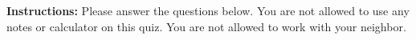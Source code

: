 \documentclass[12pt]{article}
\begin{document}
\bigskip

\bigskip
\bigskip

\textbf{Instructions:} Please answer the questions below. You are not allowed to  use any notes or calculator on this quiz. You are not allowed to work with your neighbor. 
\bigskip


\end{document}
